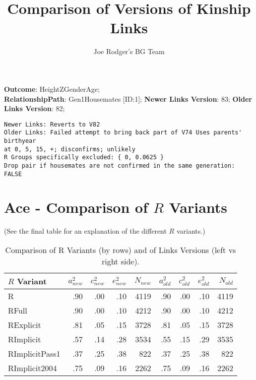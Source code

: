 \documentclass{article}\usepackage[]{graphicx}\usepackage[]{color}
\title{Comparison of Versions of Kinship Links}
\author{Joe Rodger's BG Team}
\makeatletter
\newenvironment{kframe}{%
 \def\at@end@of@kframe{}%
 \ifinner\ifhmode%
  \def\at@end@of@kframe{\end{minipage}}%
  \begin{minipage}{\columnwidth}%
 \fi\fi%
 \def\FrameCommand##1{\hskip\@totalleftmargin \hskip-\fboxsep
 \colorbox{shadecolor}{##1}\hskip-\fboxsep
     \hskip-\linewidth \hskip-\@totalleftmargin \hskip\columnwidth}%
 \MakeFramed {\advance\hsize-\width
   \@totalleftmargin\z@ \linewidth\hsize
   \@setminipage}}%
 {\par\unskip\endMakeFramed%
 \at@end@of@kframe}
\newenvironment{knitrout}{}{} %
\makeatother
\begin{document}
\maketitle
\setcounter{totalnumber}{8} %

\setlength{\parindent}{0pt}%











\textbf{Outcome}: HeightZGenderAge;\\
\textbf{RelationshipPath}: Gen1Housemates [ID:1];
\textbf{Newer Links Version}: 83;
\textbf{Older Links Version}: 82;

\begin{knitrout}
\color{fgcolor}\begin{kframe}
\begin{verbatim}
Newer Links: Reverts to V82
Older Links: Failed attempt to bring back part of V74 Uses parents' birthyear
at 0, 5, 15, +; disconfirms; unlikely
R Groups specifically excluded: { 0, 0.0625 }
Drop pair if housemates are not confirmed in the same generation: FALSE
\end{verbatim}
\end{kframe}
\end{knitrout}





\section{Ace - Comparison of $R$ Variants} 
(See the final table for an explanation of the different $R$ variants.)
\begin{table}[ht]
\centering
{\large
\begin{tabular}{l|rrrr|rrrr}
  \hline
$R$ Variant & $a_{new}^2$ & $c_{new}^2$ & $e_{new}^2$ & $N_{new}$ & $a_{old}^2$ & $c_{old}^2$ & $e_{old}^2$ & $N_{old}$ \\ 
  \hline
R & .90 & .00 & .10 & 4119 & .90 & .00 & .10 & 4119 \\ 
  RFull & .90 & .00 & .10 & 4212 & .90 & .00 & .10 & 4212 \\ 
  RExplicit & .81 & .05 & .15 & 3728 & .81 & .05 & .15 & 3728 \\ 
  RImplicit & .57 & .14 & .28 & 3534 & .55 & .15 & .29 & 3535 \\ 
  RImplicitPass1 & .37 & .25 & .38 &  822 & .37 & .25 & .38 &  822 \\ 
  RImplicit2004 & .75 & .09 & .16 & 2262 & .75 & .09 & .16 & 2262 \\ 
   \hline
\end{tabular}
}
\caption{Comparison of R Variants (by rows) and of Links Versions (left vs right side).} 
\end{table}
\end{document}
